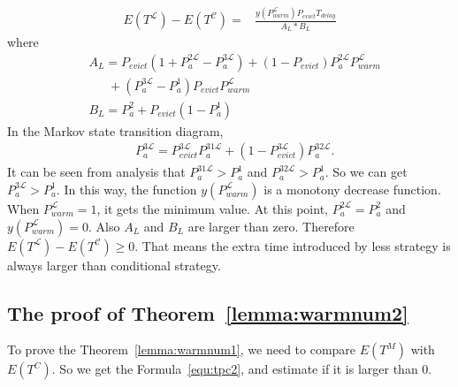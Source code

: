 \begin{equation}
\label{equ:detail1}
\begin{split}
E(T^{\mathcal{L}}) - E(T^{\mathcal{C}}) = &\frac{y(P_{warm}^{\mathcal{L}})P_{evict}T_{delay}}{A_{L}*B_{L}}
\end{split}\end{equation}
where
\begin{equation*}
\begin{split}
&A_{L}=P_{evict}(1+P_{a}^{\mathfrak{2}\mathcal{L}}-P_{a}^{\mathfrak{3}\mathcal{L}})+(1-P_{evict})P_{a}^{\mathfrak{2}\mathcal{L}}P_{warm}^{\mathcal{L}}  \\
&\ \ \ \ \ \ \ +(P_{a}^{\mathfrak{3}\mathcal{L}}-P_{a}^{\mathfrak{1}})P_{evict}P_{warm}^{\mathcal{L}} \\
&B_{L}=P_{a}^{\mathfrak{2}}+P_{evict}(1-P_{a}^{\mathfrak{1}})
\end{split}\end{equation*}
In the Markov state transition diagram, 
\begin{equation*}
\begin{split}
&P_{a}^{\mathfrak{3}\mathcal{L}}=P_{evict}^{\mathfrak{3}\mathcal{L}}P_{a}^{\mathfrak{31}\mathcal{L}}+(1-P_{evict}^{\mathfrak{3}\mathcal{L}})P_{a}^{\mathfrak{32}\mathcal{L}} .
\end{split}\end{equation*}
It can be seen from analysis that $P_{a}^{\mathfrak{31}\mathcal{L}} > P_{a}^{\mathfrak{1}}$ and $P_{a}^{\mathfrak{32}\mathcal{L}} > P_{a}^{\mathfrak{1}}$.
So we can get $P_{a}^{\mathfrak{3}\mathcal{L}} > P_{a}^{\mathfrak{1}}$.
In this way,
the function $y(P_{warm}^{\mathcal{L}})$ is a monotony decrease function. When $P_{warm}^{\mathcal{L}} = 1$, it gets the minimum value.
At this point, $P_{a}^{\mathfrak{2}\mathcal{L}} = P_{a}^{\mathfrak{2}}$ and $y(P_{warm}^{\mathcal{L}}) = 0$.
Also $A_{L}$ and $B_{L}$ are larger than zero.
Therefore $E(T^{\mathcal{L}}) - E(T^{\mathcal{C}})\geq 0$.
That means the extra time introduced by less {\vwarm} strategy is always larger than conditional {\vwarm} strategy.

\subsection{The proof of Theorem~\ref{lemma:warmnum2}}
To prove the Theorem~\ref{lemma:warmnum1}, we need to compare $E(T^{M})$ with $E(T^{C})$.
So we get the Formula~\ref{equ:tpc2}, and estimate if it is larger than $0$.

